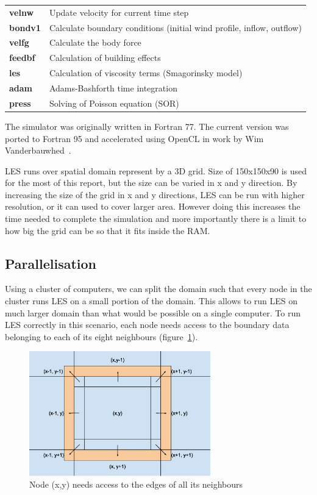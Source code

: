 \documentclass{l4proj}
\begin{document}
\begin{tabular}{ | l | l | }
  \hline  
  \textbf{velnw} & Update velocity for current time step \\
  \textbf{bondv1} & Calculate boundary conditions (initial wind profile, inflow, outflow) \\
  \textbf{velfg} & Calculate the body force \\
  \textbf{feedbf} & Calculation of building effects \\
  \textbf{les} & Calculation of viscosity terms (Smagorinsky model) \\
  \textbf{adam} & Adams-Bashforth time integration \\
  \textbf{press} & Solving of Poisson equation (SOR) \\
  \hline  
\end{tabular}

The simulator was originally written in Fortran 77. The current version was ported to Fortran 95
and accelerated using OpenCL in work by Wim Vanderbauwhed~\cite{les_wim}.

LES runs over spatial domain represent by a 3D grid. Size of 150x150x90 is used for the most
of this report, but the size can be varied in x and y direction. By increasing the size of the
grid in x and y directions, LES can be run with higher resolution, or it can used 
to cover larger area. However doing this increases the time needed to complete the simulation
and more importantly there is a limit to how big the grid can be so that it fits inside the RAM.

\subsection{Parallelisation}

Using a cluster of computers, we can split the domain such that every node in the cluster runs
LES on a small portion of the domain. This allows to run LES on much larger domain than what would be
possible on a single computer. To run LES correctly in this scenario, each node needs access to the 
boundary data belonging to each of its eight neighbours (figure~\ref{fig:neighbours}).

\begin{figure}
\centering
\includegraphics[width=0.7\textwidth]{images/Neighbour_exchange.eps}
\caption{Node (x,y) needs access to the edges of all its neighbours}
\label{fig:neighbours}
\end{figure}
\end{document}
